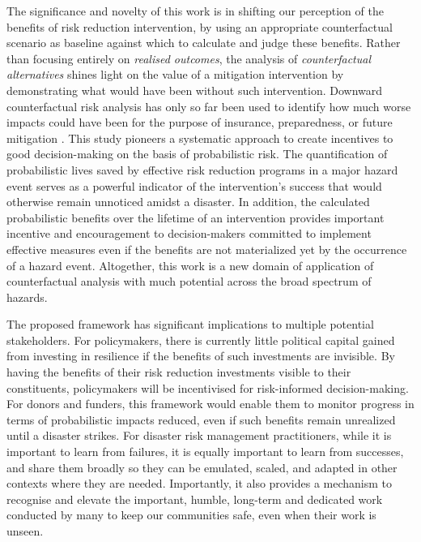 \documentclass[utf8]{frontiersSCNS} %
\begin{document}
The significance and novelty of this work is in shifting our perception of the benefits of risk reduction intervention, by using an appropriate counterfactual scenario as baseline against which to calculate and judge these benefits. Rather than focusing entirely on \textit{realised outcomes}, the analysis of \textit{counterfactual alternatives} shines light on the value of a mitigation intervention by demonstrating what would have been without such intervention. Downward counterfactual risk analysis has only so far been used to identify how much worse impacts could have been for the purpose of insurance, preparedness, or future mitigation \citep[e.g.][]{lin2020modeling, aspinall2019counterfactual, woo2019downward, woo2018counterfactual, shepherd2018storylines, woo2017reimagining, oughton2019stochastic, aspinall2019counterfactual}. This study pioneers a systematic approach to create incentives to good decision-making on the basis of probabilistic risk. The quantification of probabilistic lives saved by effective risk reduction programs in a major hazard event serves as a powerful indicator of the intervention's success that would otherwise remain unnoticed amidst a disaster. In addition, the calculated probabilistic benefits over the lifetime of an intervention provides important incentive and encouragement to decision-makers committed to implement effective measures even if the benefits are not materialized yet by the occurrence of a hazard event. Altogether, this work is a new domain of application of counterfactual analysis with much potential across the broad spectrum of hazards. 

The proposed framework has significant implications to multiple potential stakeholders. For policymakers, there is currently little political capital gained from investing in resilience if the benefits of such investments are invisible. By having the benefits of their risk reduction investments visible to their constituents, policymakers will be incentivised for risk-informed decision-making. For donors and funders, this framework would enable them to monitor progress in terms of probabilistic impacts reduced, even if such benefits remain unrealized until a disaster strikes. For disaster risk management practitioners, while it is important to learn from failures, it is equally important to learn from successes, and share them broadly so they can be emulated, scaled, and adapted in other contexts where they are needed. Importantly, it also provides a mechanism to recognise and elevate the important, humble, long-term and dedicated work conducted by many to keep our communities safe, even when their work is unseen.
\end{document}
